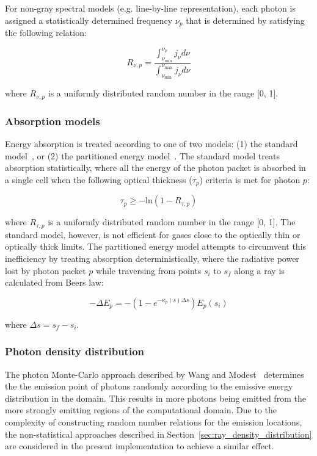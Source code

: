 For non-gray spectral models (e.g. line-by-line representation), each photon is assigned a statistically determined frequency $\nu_p$ that is determined by satisfying the following relation:

\begin{equation}
R_{\nu,p} = \frac{\int_{\nu_{\text{min}}}^{\nu_p} j_{\nu} d \nu}{\int_{\nu_{\text{min}}}^{\nu_{\text{max}}} j_{\nu} d \nu}
\end{equation}

\noindent where $R_{\nu,p}$ is a uniformly distributed random number in the range [0, 1].

\subsubsection{Absorption models}

Energy absorption is treated according to one of two models:  (1) the standard model~\cite{Mod03}, or (2) the partitioned energy model~\cite{MP77}.
The standard model treats absorption statistically, where all the energy of the photon packet is absorbed in a single cell when the following optical thickness ($\tau_p$) criteria is met for photon $p$:

\begin{equation}
 \tau_p \geq - \text{ln} \left ( 1 - R_{\tau,p} \right ) 
\end{equation}

\noindent where $R_{\tau,p}$ is a uniformly distributed random number in the range [0, 1].
The standard model, however, is not efficient for gases close to the optically thin or optically thick limits.
The partitioned energy model attempts to circumvent this inefficiency by treating absorption deterministically, where the radiative power lost by photon packet $p$ while traversing from points $s_{i}$ to $s_{f}$ along a ray is calculated from Beers law:

\begin{equation}
 - \Delta E_{p} = - ( 1 - e^{-\kappa_p(s) \Delta s } ) E_{p}(s_{i})
 \label{eq:E_p}
\end{equation}

\noindent where $\Delta s = s_{f} - s_{i}$.

\subsubsection{Photon density distribution}

The photon Monte-Carlo approach described by Wang and Modest~\cite{WM2007} determines the the emission point of photons randomly according to the emissive energy distribution in the domain.
This results in more photons being emitted from the more strongly emitting regions of the computational domain.
Due to the complexity of constructing random number relations for the emission locations, the non-statistical approaches described in Section~\ref{sec:ray_density_distribution} are considered in the present implementation to achieve a similar effect.


